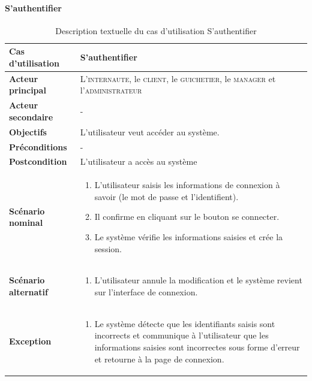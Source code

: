         \paragraph[S’authentifier]{S’authentifier}
            \begin{longtable}{p{4cm} p{9cm}}
                \caption{Description textuelle du cas d’utilisation S’authentifier}
                \label{table:usecaseSauth}
                \\\hline\hline
                    \textbf{Cas d’utilisation} & \textbf{S’authentifier}
                \\\hline\hline
                        \textbf{Acteur principal} & L’\textsc{internaute}, le \textsc{client},
                        le \textsc{guichetier}, le \textsc{manager} et l’\textsc{administrateur}
                    \\
                        \textbf{Acteur secondaire} & -
                    \\
                        \textbf{Objectifs} & L’utilisateur veut accéder au système.
                    \\
                        \textbf{Préconditions} & -
                    \\
                    \textbf{Postcondition} & L’utilisateur a accès au système
                    \\
                    \textbf{Scénario nominal} &
                        \begin{enumerate}[leftmargin=*]
                            \item L’utilisateur saisis les informations de connexion à savoir (le mot de
                            passe et l’identifient).
                            \item Il confirme en cliquant sur le bouton se connecter.
                            \item Le système vérifie les informations saisies et crée la session.
                        \end{enumerate}
                    \\
                    \textbf{Scénario alternatif} &
                    \begin{enumerate}[leftmargin=*]
                            \item L’utilisateur annule la modification et le système revient sur l’interface de
                            connexion.
                        \end{enumerate}
                    \\
                    \textbf{Exception} &
                    \begin{enumerate}[leftmargin=*]
                            \item Le système détecte que les identifiants saisis sont incorrects et communique à
                            l’utilisateur que les informations saisies sont incorrectes sous forme d’erreur et
                            retourne à la page de connexion.
                        \end{enumerate}
                \\\bottomrule
            \end{longtable}

